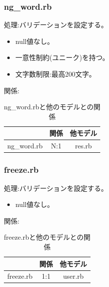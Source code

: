 \documentclass[a4j]{jarticle}
\begin{document}
\subsubsection{ng\_word.rb}
\noindent
処理:バリデーションを設定する。
\begin{itemize}
  \item null値なし。
  \item 一意性制約(ユニーク)を持つ。
  \item 文字数制限:最高200文字。
\end{itemize}
関係:
\begin{table}[H]
  \centering
  \caption{ng\_word.rbと他のモデルとの関係}
  \begin{tabular}{|c|c|c|}\hline
    & 関係 & 他モデル\\ \hline \hline
    ng\_word.rb & N:1 & res.rb \\ \hline
  \end{tabular}
\end{table}


\subsubsection{freeze.rb}
\noindent
処理:バリデーションを設定する。
\begin{itemize}
  \item null値なし。
\end{itemize}
関係:
\begin{table}[H]
  \centering
  \caption{freeze.rbと他のモデルとの関係}
  \begin{tabular}{|c|c|c|}\hline
    & 関係 & 他モデル\\ \hline \hline
    freeze.rb & 1:1 & user.rb \\ \hline
  \end{tabular}
\end{table}



\appendix
\end{document}
